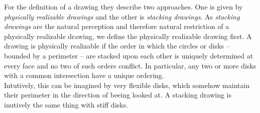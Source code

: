 \documentclass[a4paper,11pt]{article}
\begin{document}
For the definition of a drawing they describe two approaches. One is given by \textit{physically realizable drawings} and the other is \textit{stacking drawings}. As \textit{stacking drawings} are the natural perception and therefore natural restriction of a physically realizable drawing, we define the physically realizable drawing first. A drawing is physically realizable if the order in which the circles or disks -- bounded by a perimeter -- are stacked upon each other is uniquely determined at every face and no two of such orders conflict. In particular, any two or more disks with a common intersection have a unique ordering.\\
Intutively, this can be imagined by very flexible disks, which somehow maintain their perimeter in the direction of beeing looked at. A stacking drawing is inutively the same thing with stiff disks.\\
\end{document}
